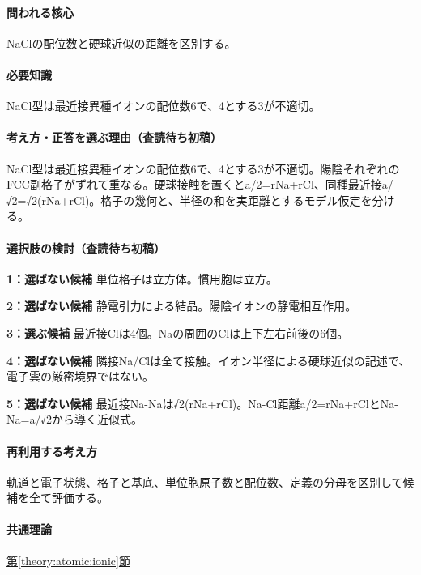 \paragraph{問われる核心} NaClの配位数と硬球近似の距離を区別する。

\paragraph{必要知識} NaCl型は最近接異種イオンの配位数6で、4とする3が不適切。

\paragraph{考え方・正答を選ぶ理由（査読待ち初稿）} NaCl型は最近接異種イオンの配位数6で、4とする3が不適切。陽陰それぞれのFCC副格子がずれて重なる。硬球接触を置くとa/2=\allowbreak{}rNa+rCl、同種最近接a/√2=√2(rNa+rCl)。格子の幾何と、半径の和を実距離とするモデル仮定を分ける。

\paragraph{選択肢の検討（査読待ち初稿）}\mbox{}\par

\noindent\textbf{1：選ばない候補} 単位格子は立方体。慣用胞は立方。\par

\noindent\textbf{2：選ばない候補} 静電引力による結晶。陽陰イオンの静電相互作用。\par

\noindent\textbf{3：選ぶ候補} 最近接Clは4個。Naの周囲のClは上下左右前後の6個。\par

\noindent\textbf{4：選ばない候補} 隣接Na/Clは全て接触。イオン半径による硬球近似の記述で、電子雲の厳密境界ではない。\par

\noindent\textbf{5：選ばない候補} 最近接Na-Naは√2(rNa+rCl)。Na-Cl距離a/2=\allowbreak{}rNa+rClとNa-Na=\allowbreak{}a/√2から導く近似式。\par

\paragraph{再利用する考え方} 軌道と電子状態、格子と基底、単位胞原子数と配位数、定義の分母を区別して候補を全て評価する。

\paragraph{共通理論} \hyperref[theory:atomic:ionic]{第\ref*{theory:atomic:ionic}節}

